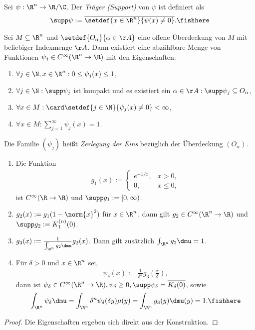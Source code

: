 \begin{defn}
\label{defn:4.43}
Sei $\psi: \R^n\to\R/\C$. Der \emph{Träger (Support)} von $\psi$ ist definiert
als
\begin{align*}
\supp\psi := \overline{\setdef{x\in\R^n}{\psi(x)\neq 0}}.\fishhere
\end{align*}
\end{defn}

\begin{prop}
\label{prop:4.44}
Sei $M\subseteq\R^n$ und $\setdef{O_\alpha}{\alpha\in\AA}$ eine offene
Überdeckung von $M$ mit beliebiger Indexmenge $\AA$. Dann existiert eine
abzählbare Menge von Funktionen $\psi_j\in C^\infty(\R^n\to\R)$ mit den
Eigenschaften:
\begin{enumerate}[label=(\roman{*})]
  \item $\forall j\in\N,x\in\R^n: 0\le \psi_j(x) \le 1$,
  \item $\forall j\in\N : \supp\psi_j$ ist kompakt und es existiert ein
  $\alpha\in\AA: \supp\psi_j \subseteq O_\alpha$,
  \item $\forall x\in M : \card\setdef{j\in\N}{\psi_j(x)\neq0}<\infty$,
  \item $\forall x\in M: \sum\limits_{j=1}^\infty \psi_j(x) = 1$.
\end{enumerate}
Die Familie $(\psi_j)$ heißt \emph{Zerlegung der Eins} bezüglich der
Überdeckung $(O_\alpha)$.\fishhere
\end{prop}

\begin{lem}
\begin{enumerate}[label=\arabic{*}.)]
  \item Die Funktion
\begin{align*}
g_1(x) := \begin{cases}
e^{-1/x}, & x> 0,\\
0, & x\le 0,
\end{cases}
\end{align*}
ist $C^\infty(\R\to\R)$ und $\supp g_1 := [0,\infty)$.
\item $g_2(x) := g_1(1-\norm{x}^2)$ für $x\in\R^n$, dann gilt $g_2\in
C^\infty(\R^n\to\R)$ und $\supp g_2 := K_1^{(n)}(0)$.
\item $g_3(x) := \frac{1}{\int_{\R^n} g_2\dmu} g_2(x)$. Dann gilt
zusätzlich $\int_{\R^n} g_3\dmu = 1$.
\item Für $\delta > 0$ und $x\in\R^n$ sei,
\begin{align*}
\psi_\delta(x) := \frac{1}{\delta^n}g_3\left(\frac{x}{\delta}\right),
\end{align*}
dann ist $\psi_\delta\in C^\infty(\R^n\to\R), \psi_\delta \ge 0, \supp
\psi_\delta = \overline{K_\delta(0)}$, sowie
\begin{align*}
\int_{\R^n} \psi_\delta \dmu = \int_{\R^n} \delta^n \psi_\delta(\delta y)\mu(y)
= \int_{\R^n} g_3(y)\dmu(y) = 1.\fishhere
\end{align*}
\end{enumerate}
\end{lem}
\begin{proof}
Die Eigenschaften ergeben sich direkt aus der Konstruktion.\qedhere
\end{proof}

